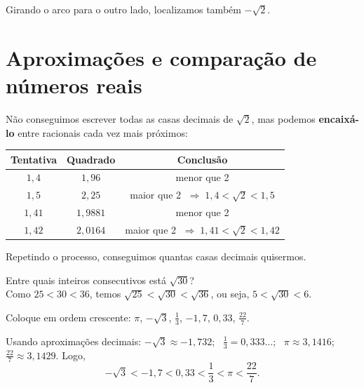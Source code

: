 \documentclass[11pt,a4paper]{article}
\begin{document}
Girando o arco para o outro lado, localizamos também $-\sqrt{2}$.

\section{Aproximações e comparação de números reais}

Não conseguimos escrever todas as casas decimais de $\sqrt{2}$, mas podemos
\textbf{encaixá-lo} entre racionais cada vez mais próximos:

\begin{center}
\renewcommand{\arraystretch}{1.3}
\begin{tabular}{c|c|c}
  Tentativa & Quadrado & Conclusão \\ \hline
  $1{,}4$   & $1{,}96$   & menor que 2 \\
  $1{,}5$   & $2{,}25$   & maior que 2 $\;\Rightarrow\; 1{,}4 < \sqrt{2} < 1{,}5$ \\ \hline
  $1{,}41$  & $1{,}9881$ & menor que 2 \\
  $1{,}42$  & $2{,}0164$ & maior que 2 $\;\Rightarrow\; 1{,}41 < \sqrt{2} < 1{,}42$ \\
\end{tabular}
\end{center}

Repetindo o processo, conseguimos quantas casas decimais quisermos.

\begin{exemplo}
Entre quais inteiros consecutivos está $\sqrt{30}$?\\
Como $25 < 30 < 36$, temos $\sqrt{25} < \sqrt{30} < \sqrt{36}$, ou seja,
$5 < \sqrt{30} < 6$.
\end{exemplo}

\begin{exemplo}
Coloque em ordem crescente: \quad $\pi$, \quad $-\sqrt{3}$, \quad $\frac{1}{3}$,
\quad $-1{,}7$, \quad $0{,}33$, \quad $\frac{22}{7}$.

\smallskip
\noindent Usando aproximações decimais:
$-\sqrt{3} \approx -1{,}732$; \ $\frac{1}{3} = 0{,}333\ldots$; \
$\pi \approx 3{,}1416$; \ $\frac{22}{7} \approx 3{,}1429$. Logo,
\[
  -\sqrt{3} < -1{,}7 < 0{,}33 < \frac{1}{3} < \pi < \frac{22}{7}.
\]
\end{exemplo}

\end{document}

